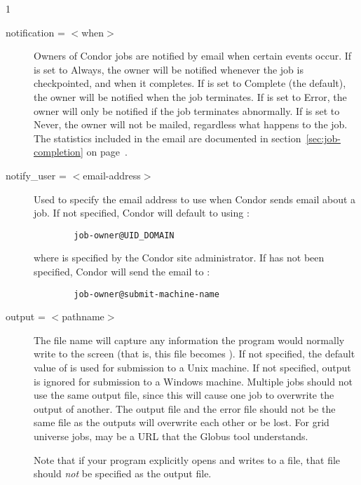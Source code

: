 \begin{ManPage}{\label{man-condor-submit}}{1}
\begin{description}
\item[notification = $<$when$>$]\label{man-condor-submit-notification} Owners of Condor jobs are notified by
email when certain events occur.
If  is set to \mbox{Always}, the owner will be notified
whenever the job is checkpointed, and when it completes.
If  is set to \mbox{Complete} (the default), the owner will
be notified when the job terminates.
If  is set to \mbox{Error}, the owner will only be notified
if the job terminates abnormally.
If  is set to \mbox{Never}, the owner will not be mailed,
regardless what happens to the job.
The statistics included in the email are documented in
section~\ref{sec:job-completion} on
page~\pageref{sec:job-completion}.


\item[notify\_user = $<$email-address$>$]\label{man-condor-submit-notify-user} Used to specify the email
address to use when Condor sends email about a job.  If not specified,
Condor will default to using :
\begin{verbatim}
        job-owner@UID_DOMAIN
\end{verbatim}
where  is specified by the Condor site administrator.  If
 has not been specified, Condor will send the email
to :
\begin{verbatim}
        job-owner@submit-machine-name
\end{verbatim}


\item[output = $<$pathname$>$]
The  file name will capture
any information the program would normally write to the screen
(that is, this file becomes ).
If not specified, the default value of
 is used for submission to a Unix machine.
If not specified, output is ignored
for submission to a Windows machine.
Multiple jobs should not use the same output
file, since this will cause one job to overwrite the output of
another.
The output file and the error file should not be the same file
as the outputs will overwrite each other or be lost.
For grid universe jobs,  may be a URL that the Globus
tool  understands.

Note that if your program explicitly opens and writes to a file,
that file should \emph{not} be specified as the output file.


\end{description}
\end{ManPage}
